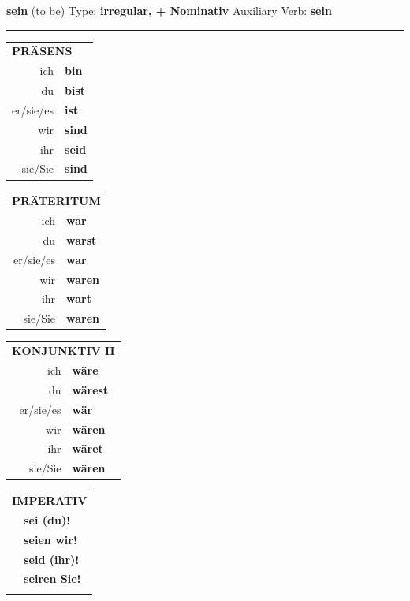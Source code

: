 \documentclass[10pt,a4paper]{revtex4-2}
\begin{document}
\begin{verbbox-nom}
    {\Large \bf sein} (to be) \hfill Type: \textbf{irregular, + Nominativ} \hfill Auxiliary Verb: \textbf{sein} 
     \vspace{5pt}
    \hrule
    \vspace{5pt}
  \begin{tabular}{rl}
     \multicolumn{2}{l}{\textbf{PRÄSENS}}\\
    ich & \textbf{bin}\\
    du & \textbf{bist}\\
    er/sie/es & \textbf{ist}\\
    wir & \textbf{sind}\\
    ihr & \textbf{seid}\\
    sie/Sie & \textbf{sind}\\
  \end{tabular}
  \hfill
     \begin{tabular}{rl}
    \multicolumn{2}{l}{\textbf{PRÄTERITUM}}\\
    ich & \textbf{war}\\
    du & \textbf{warst}\\
    er/sie/es & \textbf{war}\\
    wir & \textbf{waren}\\
    ihr & \textbf{wart}\\
    sie/Sie & \textbf{waren}\\
  \end{tabular}
    \hfill
     \begin{tabular}{rl}
    \multicolumn{2}{l}{\textbf{KONJUNKTIV II}}\\
    ich & \textbf{wäre}\\
    du & \textbf{wärest}\\
    er/sie/es & \textbf{wär}\\
    wir & \textbf{wären}\\
    ihr & \textbf{wäret}\\
    sie/Sie & \textbf{wären}\\
  \end{tabular}
  \hfill
  \begin{tabular}{rl}
     \multicolumn{2}{l}{\textbf{IMPERATIV}}\\
   & \textbf{sei (du)!}\\
   & \textbf{seien wir!}\\
   & \textbf{seid (ihr)!}\\
   & \textbf{seiren Sie!}\\
   & \vspace{10pt}
  \end{tabular}


\end{verbbox-nom}
\end{document}

